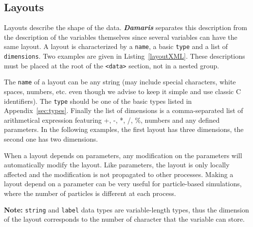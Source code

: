 \documentclass[11pt]{report}
\newcommand{\Damaris}{\emph{\textbf{Damaris}}}
\begin{document}
\noindent\begin{minipage}{\textwidth}
\vspace{0.5cm}

\end{minipage}

\subsection{Layouts}

Layouts describe the shape of the data. \Damaris{} separates this description from the description
of the variables themselves since several variables can have the same layout.
A layout is characterized by a \texttt{name}, a basic \texttt{type} and a list of \texttt{dimensions}.
Two examples are given in Listing~\ref{layoutXML}. These descriptions
must be placed at the root of the \texttt{<data>} section, not in a nested group.

The \texttt{name} of a layout can be any string (may include special characters, white spaces, numbers, etc. even
though we advise to keep it simple and use classic C identifiers).
The \texttt{type} should be one of the basic types listed in Appendix~\ref{sec:types}.
Finally the list of dimensions is a comma-separated list of arithmetical expression featuring
+, -, *, /, \%, numbers and any defined parameters.
In the following examples, the first layout has three dimensions, the second one has two dimensions.

When a layout depends on parameters, any modification on the parameters will automatically modify
the layout. Like parameters, the layout is only locally affected and the modification is not propagated to
other processes. Making a layout depend on a parameter can be very useful for particle-based simulations,
where the number of particles is different at each process.

\noindent\begin{minipage}{\textwidth}
\vspace{0.5cm}

\end{minipage}

\textbf{Note:} \texttt{string} and \texttt{label} data types are variable-length types, thus
the dimension of the layout corresponds to the number of character that the variable can store.
\end{document}
